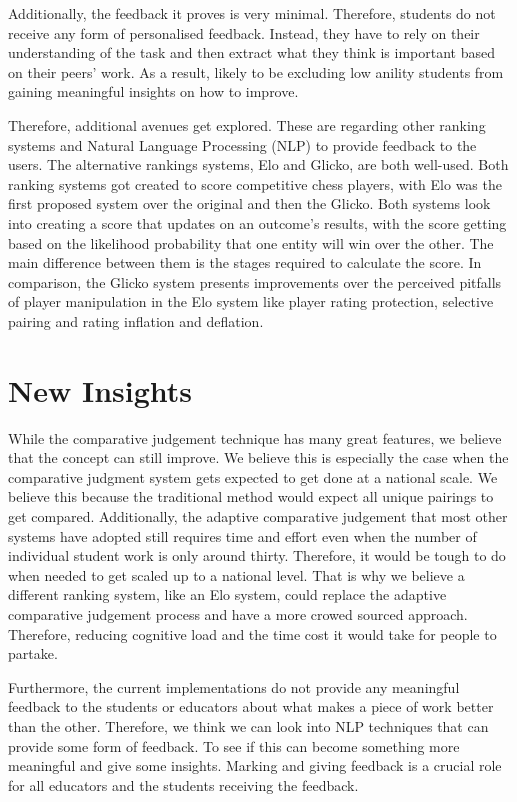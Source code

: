 	Additionally, the feedback it proves is very minimal. Therefore, students do not receive any form of personalised feedback. Instead, they have to rely on their understanding of the task and then extract what they think is important based on their peers' work. As a result, likely to be excluding low anility students from gaining meaningful insights on how to improve.
	
	Therefore, additional avenues get explored. These are regarding other ranking systems and Natural Language Processing (NLP) to provide feedback to the users. The alternative rankings systems, Elo and Glicko, are both well-used. Both ranking systems got created to score competitive chess players, with Elo was the first proposed system over the original and then the Glicko. Both systems look into creating a score that updates on an outcome's results, with the score getting based on the likelihood probability that one entity will win over the other. The main difference between them is the stages required to calculate the score. In comparison, the Glicko system presents improvements over the perceived pitfalls of player manipulation in the Elo system like player rating protection, selective pairing and rating inflation and deflation.
	
	\section{New Insights}
	While the comparative judgement technique has many great features, we believe that the concept can still improve. We believe this is especially the case when the comparative judgment system gets expected to get done at a national scale. We believe this because the traditional method would expect all unique pairings to get compared. Additionally, the adaptive comparative judgement that most other systems have adopted still requires time and effort even when the number of individual student work is only around thirty. Therefore, it would be tough to do when needed to get scaled up to a national level. That is why we believe a different ranking system, like an Elo system, could replace the adaptive comparative judgement process and have a more crowed sourced approach. Therefore, reducing cognitive load and the time cost it would take for people to partake. 
	
	Furthermore, the current implementations do not provide any meaningful feedback to the students or educators about what makes a piece of work better than the other. Therefore, we think we can look into NLP techniques that can provide some form of feedback. To see if this can become something more meaningful and give some insights. Marking and giving feedback is a crucial role for all educators and the students receiving the feedback.



